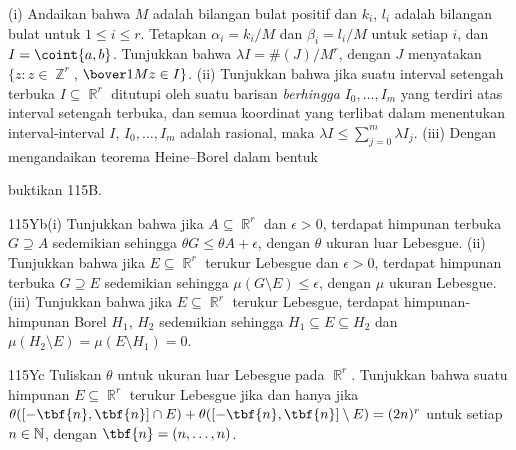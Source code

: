 {
(i) Andaikan bahwa $M$ adalah bilangan bulat positif dan $k_i$, $l_i$
adalah bilangan bulat untuk $1\le i\le r$. Tetapkan
$\alpha_i=k_i/M$ dan
$\beta_i=l_i/M$ untuk setiap $i$, dan $I=\coint{a,b}$. Tunjukkan bahwa
$\lambda I=\#(J)/M^r$, dengan $J$ menyatakan $\{z:z\in\BbbZ^r$,
$\bover1Mz\in I\}$. (ii) Tunjukkan bahwa jika suatu interval setengah
terbuka $I\subseteq\BbbR^r$ ditutupi oleh suatu barisan {\it berhingga}
$I_0,\ldots,I_m$ yang terdiri atas interval setengah terbuka, dan semua
koordinat yang terlibat dalam menentukan interval-interval $I$,
$I_0,\ldots,I_m$ adalah rasional, maka
$\lambda I\le\sum_{j=0}^m\lambda I_j$. (iii) Dengan mengandaikan
teorema Heine--Borel dalam bentuk


\noindent buktikan 115B. 

\spheader 115Yb(i)
Tunjukkan bahwa jika $A\subseteq\BbbR^r$ dan $\epsilon>0$, terdapat
himpunan terbuka $G\supseteq A$ sedemikian sehingga
$\theta G\le\theta A+\epsilon$, dengan $\theta$ ukuran luar Lebesgue.
(ii) Tunjukkan bahwa jika $E\subseteq\BbbR^r$ terukur Lebesgue dan
$\epsilon>0$, terdapat himpunan terbuka $G\supseteq E$ sedemikian
sehingga $\mu(G\setminus E)\le\epsilon$, dengan $\mu$ ukuran Lebesgue.
 (iii) Tunjukkan bahwa
jika $E\subseteq\BbbR^r$ terukur Lebesgue, terdapat himpunan-himpunan
Borel $H_1$, $H_2$ sedemikian sehingga $H_1\subseteq E\subseteq H_2$
dan $\mu(H_2\setminus E)=\mu(E\setminus H_1)=0$.

\spheader 115Yc Tuliskan $\theta$ untuk ukuran luar Lebesgue pada
$\BbbR^r$. Tunjukkan
bahwa suatu himpunan $E\subseteq\BbbR^r$ terukur Lebesgue jika dan hanya
jika
$\theta([-\tbf{n},\tbf{n}]\cap E)+\theta([-\tbf{n},\tbf{n}]\setminus
E)=(2n)^r$ untuk setiap $n\in\Bbb N$, dengan
$\tbf{n}=(n,\ldots,n)$. 

}
